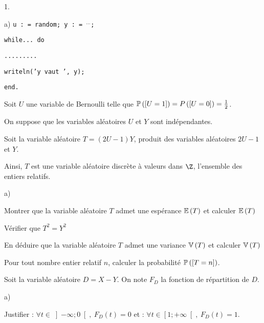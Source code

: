 \documentclass[11pt]{article}%
\begin{document}
\begin{noliste}{1.}
\begin{noliste}{a)}
\texttt{\hspace{1cm}u : = random; y : = }$^{...}$\texttt{;}

\texttt{\hspace{1cm}while... do }

\texttt{\hspace{1cm}.........}

\texttt{\hspace{1cm}writeln('y vaut ', y);}

\texttt{end.}
\end{noliste}

\item Soit $U$ une variable de Bernoulli telle que $\mathbb{P}\left(\left[ {
U = 1} \right]\right) = P\left(\left[ { U = 0} \right]\right) = \frac{1}{2}$.

On suppose que les variables aléatoires $U$ et $Y$ sont indépendantes.

Soit la variable aléatoire $T = \left( 2U-1\right) Y$, produit des
variables aléatoires $2U-1$ et $Y$.

Ainsi, $T$ est une variable aléatoire discrète à valeurs dans $\Z$,
l'ensemble des entiers relatifs.

\begin{noliste}{a)}
 \setlength{\itemsep}{2mm}
\item Montrer que la variable aléatoire $T$ admet une espérance
$\mathbb{E}\left( T\right) $ et calculer $\mathbb{E}\left( T\right) $

\item Vérifier que $T^{2} = Y^{2}$

En déduire que la variable aléatoire $T$ admet une variance $\mathbb{V}\left(
T\right) $ et calculer $\mathbb{V}\left( T\right) $

\item Pour tout nombre entier relatif $n$, calculer la probabilité
$\mathbb{P}\left(\left[ { T = n} \right]\right) $.
\end{noliste}

\item Soit la variable aléatoire $D = X-Y$. On note $F_{D}$ la fonction
de
répartition de $D$.

\begin{noliste}{a)}
 \setlength{\itemsep}{2mm}
\item Justifier : $\forall t\in \left] -\infty ;0\right[,\ F_{D}\left(
t\right) = 0$\hspace{5mm} et :\hspace{5mm} $\forall t\in \left[ 1; +
\infty \right[,\ F_{D}\left( t\right) = 1$.


\end{noliste}
\end{noliste}
\end{document}
